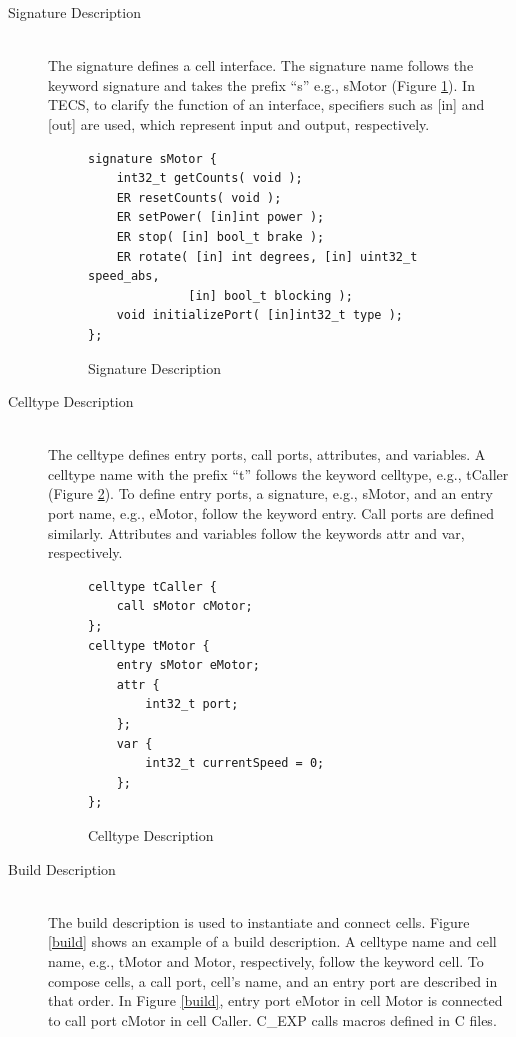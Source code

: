 \documentclass{sig-alternate-05-2015}
\begin{document}
\begin{description}
    \item[{\mybf Signature Description}]\mbox{}\\
        The {\myit signature} defines a {\myit cell} interface.
        The {\myit signature} name follows the keyword {\myit signature} and takes the prefix ``s'' e.g., sMotor (Figure \ref{signature}).
        In TECS, to clarify the function of an interface, specifiers such as [in] and [out] are used, which represent input and output, respectively.
\begin{figure}[t]
\centering
\begin{lstlisting}
signature sMotor {
    int32_t getCounts( void );
    ER resetCounts( void );
    ER setPower( [in]int power );
    ER stop( [in] bool_t brake );
    ER rotate( [in] int degrees, [in] uint32_t speed_abs,
              [in] bool_t blocking );
    void initializePort( [in]int32_t type );
};
\end{lstlisting}
\vspace{1mm}
\caption{Signature Description}
\vspace{1mm}
\label{signature}
\end{figure}
    \item[{\mybf Celltype Description}]\mbox{}\\
        The {\myit celltype} defines {\myit entry} ports, {\myit call} ports, attributes, and variables.
        A {\myit celltype} name with the prefix ``t'' follows the keyword {\myit celltype}, e.g., tCaller (Figure \ref{celltype}).
        To define {\myit entry} ports, a {\myit signature}, e.g., sMotor, and an {\myit entry} port name, e.g., eMotor, follow the keyword {\myit entry}.
        {\myit Call} ports are defined similarly.
        Attributes and variables follow the keywords {\myit attr} and {\myit var}, respectively.
\begin{figure}[t]
\centering
\begin{lstlisting}
celltype tCaller {
    call sMotor cMotor;
};
celltype tMotor {
    entry sMotor eMotor;
    attr {
        int32_t port;
    };
    var {
        int32_t currentSpeed = 0;
    };
};
\end{lstlisting}
\vspace{1mm}
\caption{Celltype Description}
\vspace{1mm}
\label{celltype}
\end{figure}
    \item[{\mybf Build Description}]\mbox{}\\
        The build description is used to instantiate and connect {\myit cell}s.
        Figure \ref{build} shows an example of a build description.
        A {\myit celltype} name and {\myit cell} name, e.g., tMotor and Motor, respectively, follow the keyword {\myit cell}.
        To compose {\myit cell}s, a {\myit call} port, {\myit cell}'s name, and an {\myit entry} port are described in that order.
        In Figure \ref{build}, {\myit entry} port eMotor in {\myit cell} Motor is connected to {\myit call} port cMotor in {\myit cell} Caller.
        {\myit C\_EXP} calls macros defined in C files.


\end{description}
\end{document}
